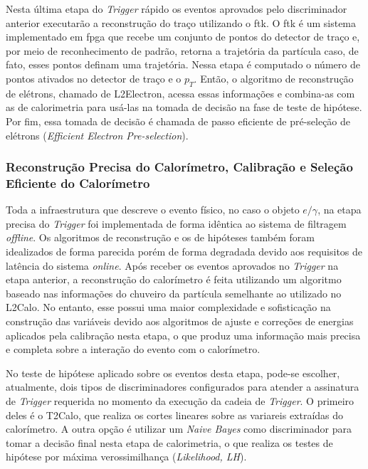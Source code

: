 Nesta última etapa do \textit{Trigger} rápido os eventos aprovados pelo discriminador anterior executarão a reconstrução do traço utilizando o \gls{ftk}.
O \gls{ftk} é um sistema implementado em \gls{fpga} que recebe um conjunto de pontos do detector de  traço e, por meio de reconhecimento de padrão, retorna 
a trajetória da partícula caso, de fato, esses pontos definam uma trajetória.  Nessa etapa é computado o número de pontos ativados no detector de traço e o $p_{T}$. Então, o algoritmo de reconstrução de elétrons, chamado de L2Electron,  acessa essas informações e combina-as com as de calorimetria para usá-las na tomada de 
decisão na fase de teste de hipótese. Por fim, essa tomada de decisão é chamada de passo eficiente de pré-seleção de elétrons (\textit{Efficient Electron Pre-selection}).

\subsubsection{Reconstrução Precisa do Calorímetro, Calibração e Seleção Eficiente do Calorímetro}

Toda a infraestrutura que descreve o evento físico, no caso o objeto $e/\gamma$, na etapa precisa do \textit{Trigger} foi implementada de forma idêntica ao sistema de filtragem  \textit{offline}. 
Os algoritmos de reconstrução e os de hipóteses também foram idealizados de forma parecida porém de forma degradada devido aos requisitos de latência do sistema \textit{online}.  
Após receber os eventos aprovados no \textit{Trigger} na etapa anterior, a reconstrução do calorímetro é feita utilizando um algoritmo baseado nas informações do chuveiro da partícula
semelhante ao utilizado no L2Calo. No entanto,  esse possui uma maior complexidade e sofisticação na construção das variáveis devido aos algoritmos de ajuste e correções de energias
aplicados pela calibração nesta etapa, o que produz uma informação mais precisa e completa sobre a interação do evento com o calorímetro.

No teste de hipótese aplicado sobre os eventos desta etapa, pode-se escolher, atualmente, dois tipos de discriminadores configurados para atender a assinatura de  \textit{Trigger} requerida 
no momento da execução da cadeia de \textit{Trigger}. O primeiro deles é o T2Calo, que realiza os cortes lineares sobre as variareis extraídas do calorímetro. A outra opção é utilizar 
um \textit{Naive Bayes} como discriminador para tomar a decisão final nesta etapa de calorimetria, o que realiza os testes de hipótese por máxima verossimilhança (\textit{Likelihood, LH}).



